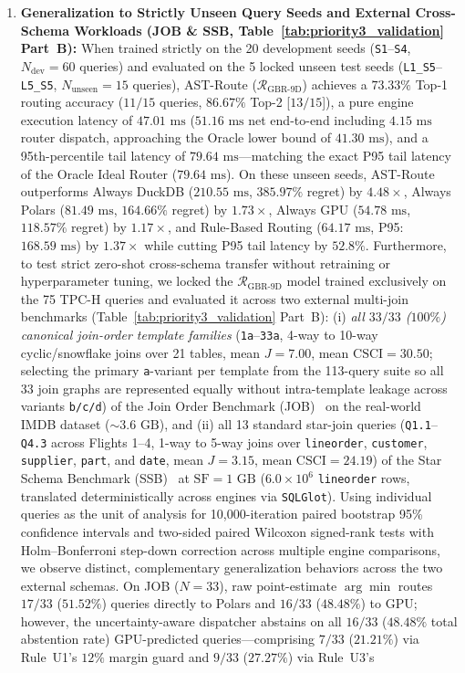 \documentclass[10pt,a4paper]{article}
\begin{document}
\begin{enumerate}[leftmargin=1.5em,itemsep=0.8pt]
    \item \textbf{Generalization to Strictly Unseen Query Seeds and External Cross-Schema Workloads (JOB \& SSB, Table~\ref{tab:priority3_validation} Part~B):} When trained strictly on the 20 development seeds (\texttt{S1}--\texttt{S4}, $N_{\text{dev}}=60$ queries) and evaluated on the 5 locked unseen test seeds (\texttt{L1\_\allowbreak{}S5}--\texttt{L5\_\allowbreak{}S5}, $N_{\text{unseen}}=15$ queries), AST-Route ($\mathcal{R}_{\text{GBR-9D}}$) achieves a $73.33\%$ Top-1 routing accuracy ($11/15$ queries, $86.67\%$ Top-2 [$13/15$]), a pure engine execution latency of $47.01\text{ ms}$ ($51.16\text{ ms}$ net end-to-end including $4.15\text{ ms}$ router dispatch, approaching the Oracle lower bound of $41.30\text{ ms}$), and a 95th-percentile tail latency of $79.64\text{ ms}$---matching the exact P95 tail latency of the Oracle Ideal Router ($79.64\text{ ms}$). On these unseen seeds, AST-Route outperforms Always DuckDB ($210.55\text{ ms}$, $385.97\%$ regret) by $4.48\times$, Always Polars ($81.49\text{ ms}$, $164.66\%$ regret) by $1.73\times$, Always GPU ($54.78\text{ ms}$, $118.57\%$ regret) by $1.17\times$, and Rule-Based Routing ($64.17\text{ ms}$, P95: $168.59\text{ ms}$) by $1.37\times$ while cutting P95 tail latency by $52.8\%$. Furthermore, to test strict zero-shot cross-schema transfer without retraining or hyperparameter tuning, we locked the $\mathcal{R}_{\text{GBR-9D}}$ model trained exclusively on the 75 TPC-H queries and evaluated it across two external multi-join benchmarks (Table~\ref{tab:priority3_validation} Part~B): (i) \emph{all $33/33$ ($100\%$) canonical join-order template families} (\texttt{1a}--\texttt{33a}, 4-way to 10-way cyclic/snowflake joins over 21 tables, mean $J=7.00$, mean $\text{CSCI}=30.50$; selecting the primary \texttt{a}-variant per template from the 113-query suite so all 33 join graphs are represented equally without intra-template leakage across variants \texttt{b/c/d}) of the Join Order Benchmark (JOB)~\cite{leis2015job} on the real-world IMDB dataset ($\sim 3.6\text{ GB}$), and (ii) all 13 standard star-join queries (\texttt{Q1.1}--\texttt{Q4.3} across Flights 1--4, 1-way to 5-way joins over \texttt{lineorder}, \texttt{customer}, \texttt{supplier}, \texttt{part}, and \texttt{date}, mean $J=3.15$, mean $\text{CSCI}=24.19$) of the Star Schema Benchmark (SSB)~\cite{oneil2009ssb} at $\text{SF}=1\text{ GB}$ ($6.0\times 10^6$ \texttt{lineorder} rows, translated deterministically across engines via \texttt{SQLGlot}). Using individual queries as the unit of analysis for 10,000-iteration paired bootstrap 95\% confidence intervals and two-sided paired Wilcoxon signed-rank tests with Holm--Bonferroni step-down correction across multiple engine comparisons, we observe distinct, complementary generalization behaviors across the two external schemas. On JOB ($N=33$), raw point-estimate $\arg\min$ routes $17/33$ ($51.52\%$) queries directly to Polars and $16/33$ ($48.48\%$) to GPU; however, the uncertainty-aware dispatcher abstains on all $16/33$ ($\mathbf{48.48\%}$ total abstention rate) GPU-predicted queries---comprising $7/33$ ($\mathbf{21.21\%}$) via Rule~U1's $12\%$ margin guard and $9/33$ ($\mathbf{27.27\%}$) via Rule~U3's 
\end{enumerate}
\end{document}
